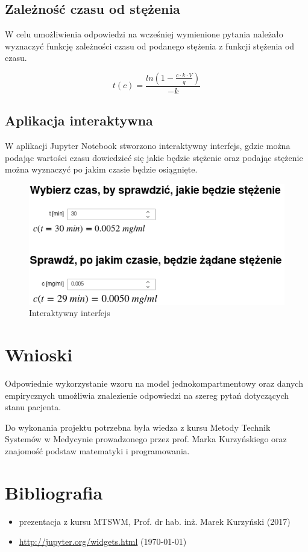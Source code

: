 \documentclass[12pt]{article}
\begin{document}
\subsection{Zależność czasu od stężenia}

W celu umożliwienia odpowiedzi na wcześniej wymienione pytania należało wyznaczyć funkcję zależności czasu od podanego stężenia z funkcji stężenia od czasu.

\begin{equation}
t(c) = \frac{ln(1 - \frac{c \cdot k \cdot V}{q})}{-k}
\end{equation}

\subsection{Aplikacja interaktywna}

W aplikacji Jupyter Notebook stworzono interaktywny interfejs, gdzie można podając 
wartości czasu dowiedzieć się jakie będzie stężenie oraz podając stężenie można wyznaczyć po jakim czasie będzie osiągnięte.

\begin{figure}[H]                                 
\centering                                        
\includegraphics[scale=.65]{interfejs.png}   
\caption{Interaktywny interfejs}                      
\label{}                                          
\end{figure}  

\section{Wnioski}

Odpowiednie wykorzystanie wzoru na model jednokompartmentowy oraz danych empirycznych umożliwia znalezienie odpowiedzi na szereg pytań dotyczących stanu pacjenta.

Do wykonania projektu potrzebna była wiedza z kursu Metody Technik Systemów w Medycynie prowadzonego przez prof. Marka Kurzyńskiego oraz znajomość podstaw matematyki i programowania.

\section{Bibliografia}

\begin{itemize}
\item prezentacja z kursu MTSWM, Prof. dr hab. inż. Marek Kurzyński (2017)
\item \url{http://jupyter.org/widgets.html} (\today)

\end{itemize}
\end{document}
